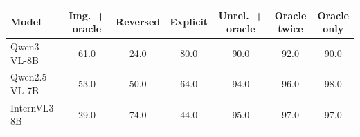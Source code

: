 \begin{tabular}{lcccccc}
\toprule
Model & Img.\ + oracle & Reversed & Explicit & Unrel.\ + oracle & Oracle twice & Oracle only \\
\midrule
Qwen3-VL-8B & 61.0 & 24.0 & 80.0 & 90.0 & 92.0 & 90.0 \\
Qwen2.5-VL-7B & 53.0 & 50.0 & 64.0 & 94.0 & 96.0 & 98.0 \\
InternVL3-8B & 29.0 & 74.0 & 44.0 & 95.0 & 97.0 & 97.0 \\
\bottomrule
\end{tabular}
